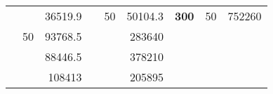 \begin{table}[H]
\begin{tabular}{|ccrccrccc}
\rowcolor[HTML]{DDFDFF} 
\multicolumn{1}{|c|}{\cellcolor[HTML]{FFFFC7}}                                & \multicolumn{1}{c|}{\cellcolor[HTML]{DDFDFF}}                      & \multicolumn{1}{r|}{\cellcolor[HTML]{DAE8FC}36519.9}   & \multicolumn{1}{c|}{\cellcolor[HTML]{FFFFC7}}                                & \multicolumn{1}{c|}{\multirow{-10}{*}{\cellcolor[HTML]{DDFDFF}50}}  & \multicolumn{1}{r|}{\cellcolor[HTML]{DDFDFF}50104.3}   & \multicolumn{1}{c|}{\multirow{-19}{*}{\cellcolor[HTML]{FFFFC7}\textbf{300}}} & \multicolumn{1}{c|}{\multirow{-10}{*}{\cellcolor[HTML]{DDFDFF}50}} & \multicolumn{1}{r|}{\cellcolor[HTML]{DDFDFF}752260}    \\ \cline{3-3} \cline{5-9} 
\multicolumn{1}{|c|}{\cellcolor[HTML]{FFFFC7}}                                & \multicolumn{1}{c|}{\multirow{-10}{*}{\cellcolor[HTML]{DDFDFF}50}} & \multicolumn{1}{r|}{\cellcolor[HTML]{DDFDFF}93768.5}   & \multicolumn{1}{c|}{\cellcolor[HTML]{FFFFC7}}                                & \multicolumn{1}{c|}{\cellcolor[HTML]{DAE8FC}}                       & \multicolumn{1}{r|}{\cellcolor[HTML]{DAE8FC}283640}    &                                                                              &                                                                    &                                                        \\ \cline{2-3} \cline{6-6}
\multicolumn{1}{|c|}{\cellcolor[HTML]{FFFFC7}}                                & \multicolumn{1}{c|}{\cellcolor[HTML]{DAE8FC}}                      & \multicolumn{1}{r|}{\cellcolor[HTML]{DAE8FC}88446.5}   & \multicolumn{1}{c|}{\cellcolor[HTML]{FFFFC7}}                                & \multicolumn{1}{c|}{\cellcolor[HTML]{DAE8FC}}                       & \multicolumn{1}{r|}{\cellcolor[HTML]{DDFDFF}378210}    &                                                                              &                                                                    &                                                        \\ \cline{3-3} \cline{6-6}
\multicolumn{1}{|c|}{\cellcolor[HTML]{FFFFC7}}                                & \multicolumn{1}{c|}{\cellcolor[HTML]{DAE8FC}}                      & \multicolumn{1}{r|}{\cellcolor[HTML]{DDFDFF}108413}    & \multicolumn{1}{c|}{\cellcolor[HTML]{FFFFC7}}                                & \multicolumn{1}{c|}{\cellcolor[HTML]{DAE8FC}}                       & \multicolumn{1}{r|}{\cellcolor[HTML]{DAE8FC}205895}    &                                                                              &                                                                    &                                                        \\ \cline{3-3} \cline{6-6}

\end{tabular}
\end{table}
